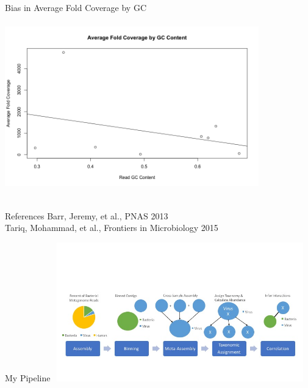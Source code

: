 \documentclass[11pt]{beamer}
\begin{document}
	
	\begin{frame}{Bias in Average Fold Coverage by GC}
	\includegraphics[height=8cm, width=11cm]{Viral_Coverage_by_GC.png}
	\end{frame}
	
	
	\begin{frame}{References}
	\tiny{ Barr, Jeremy, et al., PNAS 2013 \\ Tariq, Mohammad, et al., Frontiers in Microbiology 2015}
	\end{frame}
	
	\begin{frame}{My Pipeline}
	\vspace{-1cm}
	\includegraphics[height=6cm, width=11cm]{figure_2_updated.jpg}
	\end{frame}
	
\end{document}
